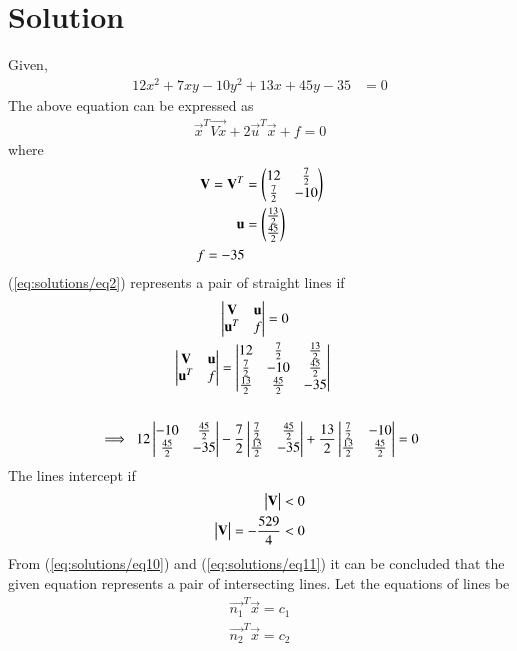 \documentclass[journal,12pt,twocolumn]{IEEEtran}
\begin{document}
\section{Solution}
Given,
\begin{align}
    12x^2+7xy-10y^2+13x+45y-35&=0 \label{eqgiven}
\end{align}
The above equation can be expressed as
\begin{align}
        \vec{x}^{T}\vec{Vx} + 2\vec{u}^{T}\vec{x} + f=0   \label{eq:solutions/eq2}
\end{align}
where
\begin{align}
	\mathbf{V}=\mathbf{V}^T &= \begin{pmatrix}12 & \frac{7}{2} \\ \frac{7}{2} & -10\end{pmatrix} \\
	\mathbf{u} &= \begin{pmatrix}\frac{13}{2} \\ \frac{45}{2}\end{pmatrix} \\
	 f=-35
\end{align}	
	(\ref{eq:solutions/eq2}) represents a pair of straight lines if
\begin{align}
	&\begin{vmatrix}\mathbf{V} & \mathbf{u} \\ \mathbf{u}^T & f\end{vmatrix} = 0     \label{eq:solutions/eq5} \\
	\begin{vmatrix}\mathbf{V} & \mathbf{u} \\ \mathbf{u}^T & f\end{vmatrix} 
		&= \begin{vmatrix}12 & \frac{7}{2}  & \frac{13}{2} \\ 
	        \frac{7}{2} & -10 & \frac{45}{2}     \\
	       \frac{13}{2} & \frac{45}{2} & -35 \end{vmatrix}  \\
	       		\nonumber \\
	\implies \ 12\begin{vmatrix}-10 & \frac{45}{2} \\ \frac{45}{2} & -35\end{vmatrix} 
		& -\frac{7}{2}\begin{vmatrix}\frac{7}{2} & \frac{45}{2} \\ \frac{13}{2} & -35\end{vmatrix} 
		+\frac{13}{2}\begin{vmatrix}\frac{7}{2} & -10 \\ \frac{13}{2} & \frac{45}{2}\end{vmatrix} = 0 \label{eq:solutions/eq10}
\end{align}
The lines intercept if
\begin{align}
        \begin{vmatrix}\mathbf{V}\end{vmatrix} < 0 \\
 	\begin{vmatrix}\mathbf{V}\end{vmatrix}=-\frac{529}{4} < 0 \label{eq:solutions/eq11}
\end{align}
\renewcommand{\thefigure}{1}
From (\ref{eq:solutions/eq10}) and (\ref{eq:solutions/eq11}) it can be concluded that the given equation represents a pair of intersecting lines.
Let the equations of lines be
\begin{align}
	\vec{n_1}^T \vec{x}=c_1 \\
	\vec{n_2}^T \vec{x}=c_2 
\end{align}
\end{document}
